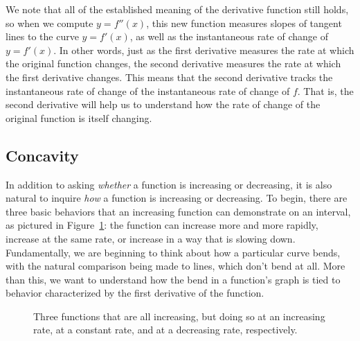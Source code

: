 We note that all of the established meaning of the derivative function still holds, so when we compute $y = f''(x)$, this new function measures slopes of tangent lines to the curve $y = f'(x)$, as well as the instantaneous rate of change of $y = f'(x)$.  In other words, just as the first derivative measures the rate at which the original function changes, the second derivative measures the rate at which the first derivative changes.  This means that the second derivative tracks the instantaneous rate of change of the instantaneous rate of change of $f$.  That is, the second derivative will help us to understand how the rate of change of the original function is itself changing.


\subsection*{Concavity}

In addition to asking \emph{whether} a function is increasing or decreasing, it is also natural to inquire \emph{how} a function is increasing or decreasing.  To begin, there are three basic behaviors that an increasing function can demonstrate on an interval, as pictured in Figure~\ref{F:1.6.3optsi}:  the function can increase more and more rapidly, increase at the same rate, or increase in a way that is slowing down.  Fundamentally, we are beginning to think about how a particular curve bends, with the natural comparison being made to lines, which don't bend at all.  More than this, we want to understand how the bend in a function's graph is tied to behavior characterized by the first derivative of the function.

\begin{figure}[ht]
\begin{center}
\caption{Three functions that are all increasing, but doing so at an increasing rate, at a constant rate, and at a decreasing rate, respectively.} \label{F:1.6.3optsi}
\end{center}
\end{figure}

